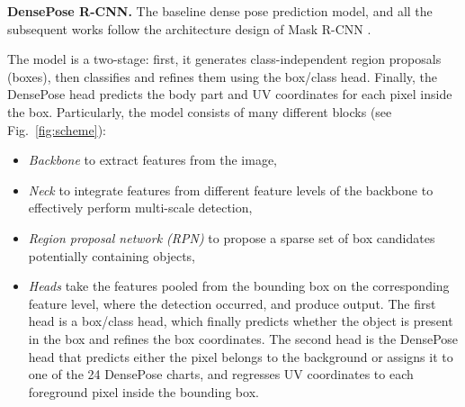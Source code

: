 \noindent \textbf{DensePose R-CNN.} The baseline dense pose prediction model, and all the subsequent works \cite{parsing, uncertainty, monkeys} follow the architecture design of Mask R-CNN \cite{maskrcnn}.

The model is a two-stage: first, it generates class-independent region proposals (boxes), then classifies and refines them using the box/class head. Finally, the DensePose head predicts the body part and UV coordinates for each pixel inside the box. Particularly, the model consists of many different blocks (see Fig.~\ref{fig:scheme}):
\begin{itemize}
    \item \textit{Backbone} to extract features from the image,
    \item \textit{Neck} to integrate features from different feature levels of the backbone to effectively perform multi-scale detection,
    \item \textit{Region proposal network (RPN)} to propose a sparse set of box candidates potentially containing objects,
    \item \textit{Heads} take the features pooled from the bounding box on the corresponding feature level, where the detection occurred, and produce output. The first head is a box/class head, which finally predicts whether the object is present in the box and refines the box coordinates. The second head is the DensePose head that predicts either the pixel belongs to the background or assigns it to one of the 24 DensePose charts, and regresses UV coordinates to each foreground pixel inside the bounding box.
\end{itemize}